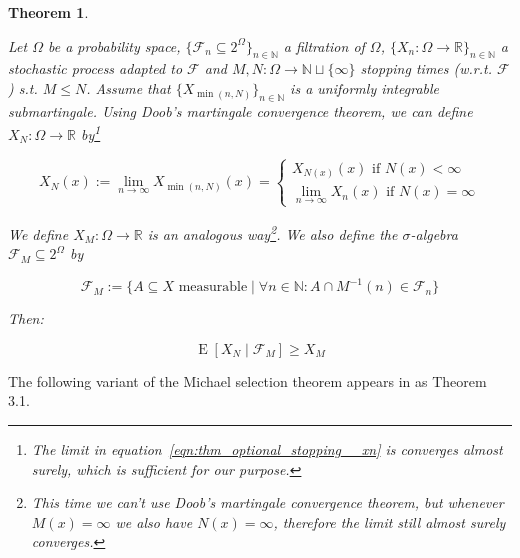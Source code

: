 \documentclass[11pt]{article}
\theoremstyle{definition}
\theoremstyle{plain}
\newtheorem{theorem}{Theorem}%
\newcommand{\Nats}{\mathbb{N}}
\newcommand{\Reals}{\mathbb{R}}
\newcommand{\Sq}[2]{\{#1\}_{#2 \in \Nats}}
\newcommand{\Sqn}[1]{\Sq{#1}{n}}
\DeclareMathOperator{\E}{E}
\newcommand{\F}{\mathcal{F}}
\begin{document}
\begin{samepage}
\begin{theorem}
\label{thm:optional_stopping}

Let ${\Omega}$ be a probability space, ${\Sqn{\F_n \subseteq 2^\Omega}}$ a filtration of ${\Omega}$, ${\Sqn{X_n: \Omega \rightarrow \Reals}}$ a stochastic process adapted to ${\F}$ and ${M,N: \Omega \rightarrow \Nats \sqcup \{\infty\}}$ stopping times (w.r.t. ${\F}$) s.t. ${M \leq N}$. Assume that ${\Sqn{X_{\min(n,N)}}}$ is a uniformly integrable submartingale. Using Doob's martingale convergence theorem, we can define ${X_N : \Omega \rightarrow \Reals}$ by\footnote{The limit in equation~\ref{eqn:thm_optional_stopping__xn} is converges \emph{almost} surely, which is sufficient for our purpose.}

\begin{equation}
\label{eqn:thm_optional_stopping__xn}
X_N(x):=\lim_{n \rightarrow \infty} X_{\min(n,N)}(x)=\begin{cases}X_{N(x)}(x) \text{ if } N(x) < \infty\\\lim_{n \rightarrow \infty} X_n(x) \text{ if } N(x) = \infty\end{cases}
\end{equation}

We define ${X_M: \Omega \rightarrow \Reals}$ is an analogous way\footnote{This time we can't use Doob's martingale convergence theorem, but whenever ${M(x) = \infty}$ we also have ${N(x) = \infty}$, therefore the limit still almost surely converges.}. We also define the $\sigma$-algebra ${\F_M \subseteq 2^\Omega}$ by

\begin{equation}
\F_M:=\{A \subseteq X \text{ measurable} \mid \forall n \in \Nats: A \cap M^{-1}(n) \in \F_n\}
\end{equation}

Then:

\begin{equation}
\E[X_N \mid \F_M] \geq X_M
\end{equation}

\end{theorem}
\end{samepage}

The following variant of the Michael selection theorem appears in \cite{Yannelis_1983} as Theorem 3.1.
\end{document}
